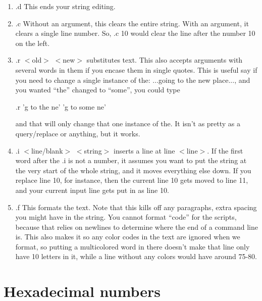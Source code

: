 \begin{enumerate}

\item .d This ends your string editing.

\item .c Without an argument, this clears the entire string. With an
argument, it clears a single line number. So, .c 10 would clear the
line after the number 10 on the left.

\item .r $<$old$>$ $<$new$>$ substitutes text. This also accepts
arguments with several words in them if you encase them in single
quotes. This is useful say if you need to change a single instance of
the: ...going to the new place..., and you wanted ``the'' changed to
``some'', you could type

.r 'g to the ne' 'g to some ne'

and that will only change that one instance of the. It isn't as pretty as a query/replace or anything, but it works. 

\item .i $<$line/blank$>$ $<$string$>$ inserts a line at line
$<$line$>$. If the first word after the .i is not a number, it assumes
you want to put the string at the very start of the whole string, and
it moves everything else down. If you replace line 10, for instance,
then the current line 10 gets moved to line 11, and your current input
line gets put in as line 10.

\item .f This formats the text. Note that this kills off any
paragraphs, extra spacing you might have in the string. You cannot
format ``code'' for the scripts, because that relies on newlines to
determine where the end of a command line is. This also makes it so
any color codes in the text are ignored when we format, so putting a
multicolored word in there doesn't make that line only have 10 letters
in it, while a line without any colors would have around 75-80.


\end{enumerate}

\section{Hexadecimal numbers}

